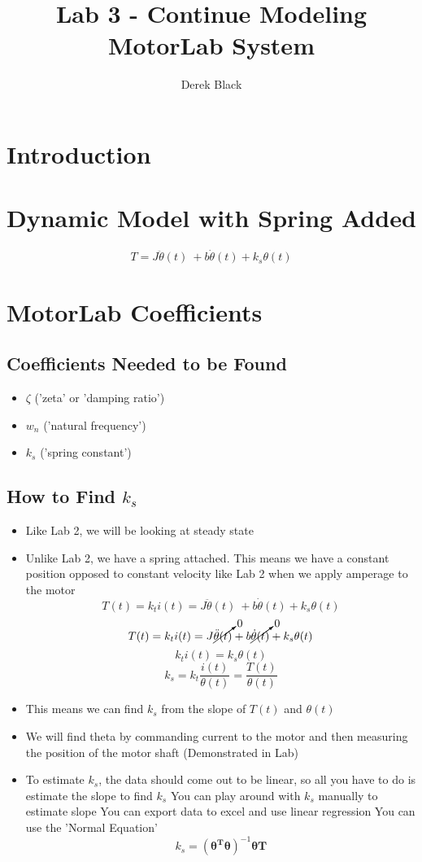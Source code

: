 \documentclass[11pt, oneside]{article}   	%
\title{\vspace{-3.0cm}Lab 3 - Continue Modeling MotorLab System}
\author{Derek Black}
\date{\vspace{-5ex}}
\newcommand{\matrva}[1]{\bm{#1}}
\begin{document}
\maketitle

\section{Introduction}

\section{Dynamic Model with Spring Added}

\[T = J \ddot \theta(t) \ + b \dot \theta(t) + k_s \theta(t) \]

\section{MotorLab Coefficients}

\subsection{Coefficients Needed to be Found}
\begin{itemize}
\item \(\zeta\)    ('zeta' or 'damping ratio')
\item \(w_n\)     ('natural frequency')
\item \(k_s\)      ('spring constant')
\end{itemize}

\subsection{How to Find \(k_s\)}
\begin{itemize}
\item Like Lab 2, we will be looking at steady state
\item Unlike Lab 2, we have a spring attached. This means we have a constant position opposed to constant velocity like Lab 2 when we apply amperage to the motor
\[T(t) = k_t i(t) =  J \ddot \theta(t) \ + b \dot \theta(t) + k_s \theta(t) \]
\[T(t) = k_t i(t) =  J \cancelto{0}{\ddot \theta(t)}  + b \cancelto{0}{\dot \theta(t)} + k_s \theta(t) \]
\[k_t i(t) = k_s \theta(t) \] \label{eu_eqn}
\[k_s = k_t \frac{i(t)}{\theta(t)}  = \frac{T(t)}{\theta(t)}\] 
\item This means we can find \(k_s\) from the slope of \(T(t)\) and \(\theta(t)\)

\item We will find theta by commanding current to the motor and then measuring the position of the motor shaft (Demonstrated in Lab)
\item To estimate \(k_s\), the data should come out to be linear, so all you have to do is estimate the slope to find \(k_s\)
\subitem You can play around with \(k_s\) manually to estimate slope
\subitem You can export data to excel and use linear regression
\subitem You can use the 'Normal Equation'
\[k_s = (\matrva{\theta^T \theta})^{-1} \matrva{\theta T}    \]
\end{itemize}
\end{document}
